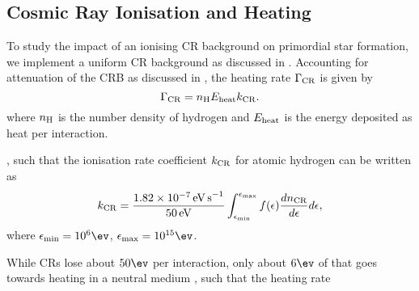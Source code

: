 \subsection{Cosmic Ray Ionisation and Heating}
\label{CRchem}
To study the impact of an ionising CR background on primordial star formation, we implement a uniform CR background as discussed in . Accounting for attenuation of the CRB as discussed in , the heating rate $\Gamma_{\rm \small CR}$ is given by
\begin{equation}
\Gamma_{\rm \small CR} = n_{\rm \small H} E_{\rm \small heat} k_{\rm \small CR}.
\end{equation}
where $n_{\rm \small H}$ is the number density of hydrogen and $E_{\rm \small heat}$ is the energy deposited as heat per interaction.

, such that the ionisation rate coefficient $k_{\rm \small CR}$ for atomic hydrogen \citep{Schlickeiser2002} can be written as
\begin{equation}
k_{\rm \small CR} = \frac{1.82\times10^{-7}\,{\rm \small eV\,s}^{-1}}{50\,{\rm \small eV}} 
    \int_{\epsilon_{\rm min}}^{\epsilon_{\rm max}} f(\epsilon) \frac{dn_{\rm \tiny CR}}{d\epsilon} d\epsilon,
\end{equation}
where $\epsilon_{\rm min} = 10^6\ev$, $\epsilon_{\rm max}= 10^{15}\ev$.

While CRs lose about $50\ev$ per interaction, only about $6\ev$ of that goes towards heating in a neutral medium \citep{SpitzerScott1969, ShullvanSteenberg1985}, such that the heating rate 